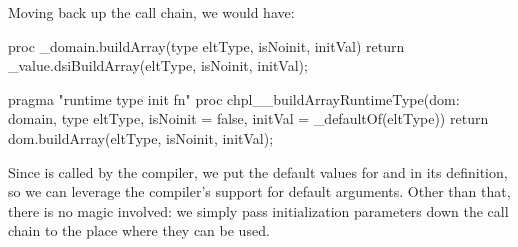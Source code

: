 Moving back up the call chain, we would have:
\begin{chapel}
    proc _domain.buildArray(type eltType, isNoinit, initVal) {
      return _value.dsiBuildArray(eltType, isNoinit, initVal);
    }

  pragma "runtime type init fn"
  proc chpl__buildArrayRuntimeType(dom: domain, type eltType, 
                                   isNoinit = false, initVal = _defaultOf(eltType))
    return dom.buildArray(eltType, isNoinit, initVal);
\end{chapel}
Since  is called by the compiler, we put the default
values for  and  in its definition, so we can leverage the
compiler's support for default arguments.  Other than that, there is no magic involved: we
simply pass initialization parameters down the call chain to the place where they can be
used.

